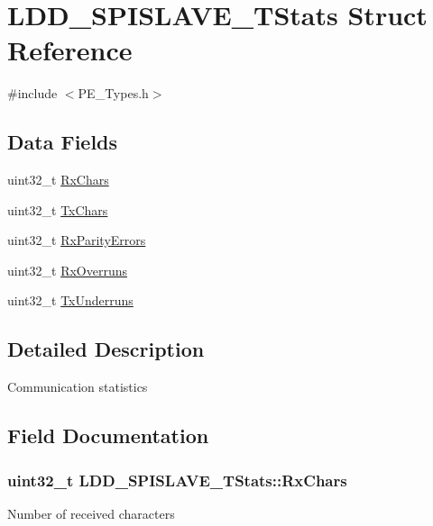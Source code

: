 \hypertarget{struct_l_d_d___s_p_i_s_l_a_v_e___t_stats}{}\section{L\+D\+D\+\_\+\+S\+P\+I\+S\+L\+A\+V\+E\+\_\+\+T\+Stats Struct Reference}
\label{struct_l_d_d___s_p_i_s_l_a_v_e___t_stats}


{\ttfamily \#include $<$P\+E\+\_\+\+Types.\+h$>$}

\subsection*{Data Fields}
\begin{DoxyCompactItemize}
\item 
uint32\+\_\+t \hyperlink{struct_l_d_d___s_p_i_s_l_a_v_e___t_stats_a91f6acf13143110968772d344d352fc6}{Rx\+Chars}
\item 
uint32\+\_\+t \hyperlink{struct_l_d_d___s_p_i_s_l_a_v_e___t_stats_ab674ba50318e198a1ee9dea0692ce239}{Tx\+Chars}
\item 
uint32\+\_\+t \hyperlink{struct_l_d_d___s_p_i_s_l_a_v_e___t_stats_abef442625b92cf52c2ff04edf6894dd3}{Rx\+Parity\+Errors}
\item 
uint32\+\_\+t \hyperlink{struct_l_d_d___s_p_i_s_l_a_v_e___t_stats_a82edd5dc5e18e7cd6a047d0efbda97ae}{Rx\+Overruns}
\item 
uint32\+\_\+t \hyperlink{struct_l_d_d___s_p_i_s_l_a_v_e___t_stats_ab2e5342f4a486b20ae9306f451451a77}{Tx\+Underruns}
\end{DoxyCompactItemize}


\subsection{Detailed Description}
Communication statistics 

\subsection{Field Documentation}
\hypertarget{struct_l_d_d___s_p_i_s_l_a_v_e___t_stats_a91f6acf13143110968772d344d352fc6}{}
\subsubsection[{Rx\+Chars}]{\setlength{\rightskip}{0pt plus 5cm}uint32\+\_\+t L\+D\+D\+\_\+\+S\+P\+I\+S\+L\+A\+V\+E\+\_\+\+T\+Stats\+::\+Rx\+Chars}\label{struct_l_d_d___s_p_i_s_l_a_v_e___t_stats_a91f6acf13143110968772d344d352fc6}
Number of received characters \hypertarget{struct_l_d_d___s_p_i_s_l_a_v_e___t_stats_a82edd5dc5e18e7cd6a047d0efbda97ae}{}
